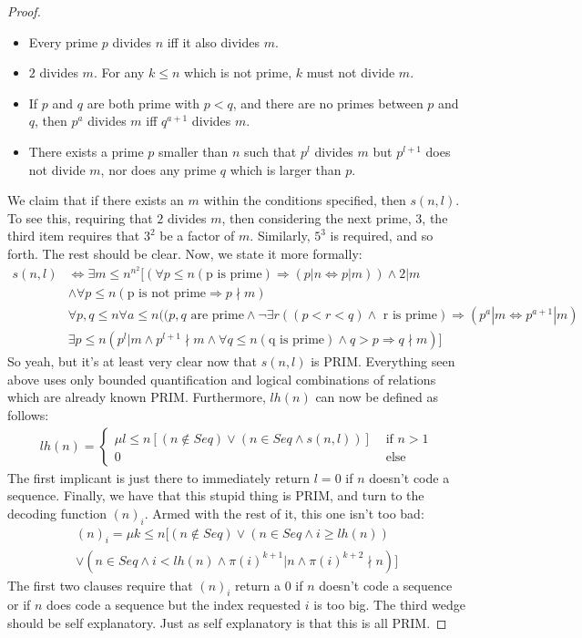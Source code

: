 \documentclass{article}
\theoremstyle{definition}
\theoremstyle{plain}
\theoremstyle{theorem}
\begin{document}
\begin{proof}
\begin{itemize}
        \item Every prime $p$ divides $n$ iff it also divides $m$.
        \item $2$ divides $m$. For any $k \leq n$ which is not prime, $k$ must not divide $m$.
        \item If $p$ and $q$ are both prime with $p < q$, and there are no primes between $p$ and $q$, then $p^a$ divides $m$ iff $q^{a+1}$ divides $m$. 
        \item There exists a prime $p$ smaller than $n$ such that $p^l$ divides $m$ but $p^{l+1}$ does not divide $m$, nor does any prime $q$ which is larger than $p$.
    \end{itemize}
    We claim that if there exists an $m$ within the conditions specified, then $s(n,l)$. To see this, requiring that $2$ divides $m$, then considering the next prime, $3$, the third item requires that $3^2$ be a factor of $m$. Similarly, $5^3$ is required, and so forth. The rest should be clear. Now, we state it more formally:
    \begin{align*}
         s(n,l) & \iff \exists m \leq n^{n^2} [(\forall p \leq n (\textrm{p is prime}) \Rightarrow (p|n \iff p|m)) \wedge 2|m \\ & \wedge \forall p \leq n (\textrm{p is not prime} \Rightarrow p \nmid m) \\ & \forall p,q \leq n \forall a \leq n ((\textrm{$p,q$ are prime} \wedge \neg \exists r ((p < r < q) \wedge \textrm{ r is prime}) \Rightarrow (p^a|m \iff p^{a+1}|m) \\ & \exists p \leq n (p^l|m \wedge p^{l+1}\nmid m \wedge \forall q \leq n (\textrm{q is prime}) \wedge q > p \Rightarrow q \nmid m)] 
    \end{align*} 
    So yeah, but it's at least very clear now that $s(n,l)$ is PRIM. Everything seen above uses only bounded quantification and logical combinations of relations which are already known PRIM. Furthermore, $lh(n)$ can now be defined as follows:
    \begin{align}
        lh(n) = \begin{cases}
                   \mu l \leq n[(n \notin Seq) \vee (n \in Seq \wedge s(n,l))] & \textrm{ if $n > 1$} \\
                   0 & \textrm{ else}
                \end{cases}
    \end{align}
    The first implicant is just there to immediately return $l = 0$ if $n$ doesn't code a sequence. Finally, we have that this stupid thing is PRIM, and turn to the decoding function $(n)_i$. Armed with the rest of it, this one isn't too bad:
    \begin{align}
        (n)_i = \mu k \leq n [(n \notin Seq) \vee (n \in Seq \wedge i \geq lh(n)) \\ \vee (n \in Seq \wedge i < lh(n) \wedge \pi(i)^{k+1}|n \wedge \pi(i)^{k+2}\nmid n)]
    \end{align}
    The first two clauses require that $(n)_i$ return a $0$ if $n$ doesn't code a sequence or if $n$ does code a sequence but the index requested $i$ is too big. The third wedge should be self explanatory. Just as self explanatory is that this is all PRIM. 
\end{proof}
\end{document}
